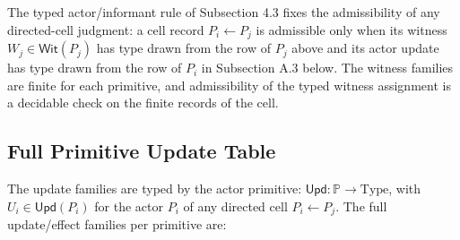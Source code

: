 \documentclass[11pt]{article}
\theoremstyle{definition}
\begin{document}
The typed actor/informant rule of Subsection 4.3 fixes the admissibility of any directed-cell judgment: a cell record \(P_{i}\leftarrow P_{j}\) is admissible only when its witness \(W_{j}\in\mathsf{Wit}(P_{j})\) has type drawn from the row of \(P_{j}\) above and its actor update has type drawn from the row of \(P_{i}\) in Subsection A.3 below. The witness families are finite for each primitive, and admissibility of the typed witness assignment is a decidable check on the finite records of the cell.

\subsection{Full Primitive Update Table}

The update families are typed by the actor primitive: \(\mathsf{Upd}:\mathbb P\to\mathrm{Type}\), with \(U_{i}\in\mathsf{Upd}(P_{i})\) for the actor \(P_{i}\) of any directed cell \(P_{i}\leftarrow P_{j}\). The full update/effect families per primitive are:
\end{document}
